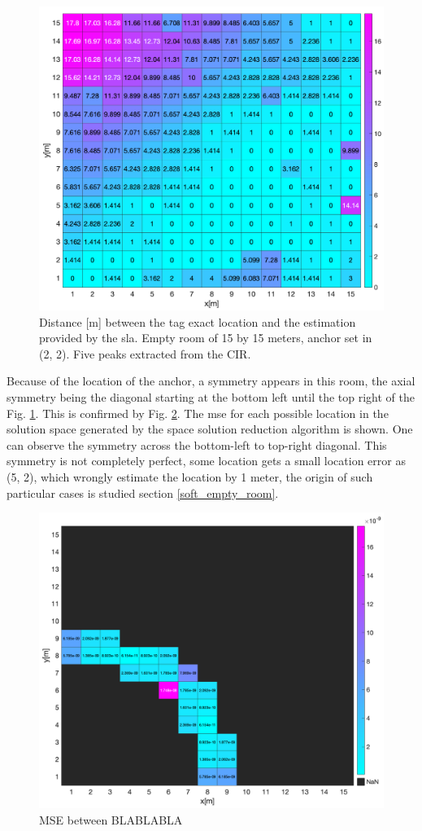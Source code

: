 \begin{figure}[H]
\centering
\includegraphics[width=.9\linewidth]{Images/15_15_sym.png}
\caption{Distance [m] between the tag exact location and the estimation provided by the \gls{sla}. Empty room of 15 by 15 meters, anchor set in (2, 2). Five peaks extracted from the CIR. \label{fig:square_sym}}
\end{figure}

Because of the location of the anchor, a symmetry appears in this room, the axial symmetry being the diagonal starting at the bottom left until the top right of the Fig. \ref{fig:square_sym}. This is confirmed by Fig. \ref{fig:square_sym_cir_comparison}. The \gls{mse} for each possible location in the solution space generated by the space solution reduction algorithm is shown. One can observe the symmetry across the bottom-left to top-right diagonal. This symmetry is not completely perfect, some location gets a small location error as (5, 2), which wrongly estimate the location by 1 meter, the origin of such particular cases is studied section \ref{soft_empty_room}.

\begin{figure}[H]
\centering
\includegraphics[width=.9\linewidth]{Images/square_sym_mse_4_8.png}
\caption{MSE between BLABLABLA \label{fig:square_sym_cir_comparison}}
\end{figure} 

